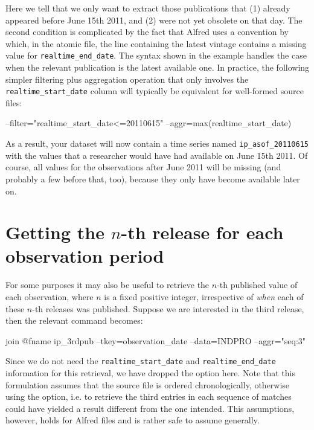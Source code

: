 \begin{itemize}
  Here we tell  that we only want to extract those
  publications that (1) already appeared before June 15th 2011, and
  (2) were not yet obsolete on that day. The second condition is
  complicated by the fact that Alfred uses a convention by which, in
  the atomic file, the line containing the latest vintage contains a
  missing value for \texttt{realtime\_end\_date}. The syntax shown in
  the example handles the case when the relevant publication is the
  latest available one. In practice, the following simpler filtering
  plus aggregation operation that only involves the
  \verb|realtime_start_date| column will typically be equivalent for
  well-formed source files: 
\end{itemize}
\begin{code}
  --filter="realtime_start_date<=20110615" --aggr=max(realtime_start_date)
\end{code}
As a result, your dataset will now contain a time series named
\verb|ip_asof_20110615| with the values that a researcher would have
had available on June 15th 2011. Of course, all values for the
observations after June 2011 will be missing (and probably a few
before that, too), because they only have become available later on.

\section{Getting the $n$-th release for each observation period}

For some purposes it may also be useful to retrieve the $n$-th published
value of each observation, where $n$ is a fixed positive integer,
irrespective of \emph{when} each of these $n$-th releases was
published. Suppose we are interested in the third release, then the
relevant  command becomes:
\begin{code}
  join @fname ip_3rdpub --tkey=observation_date --data=INDPRO --aggr="seq:3"
\end{code}
Since we do not need the \verb|realtime_start_date| and
\verb|realtime_end_date| information for this retrieval, we have
dropped the  option here. Note that this formulation
assumes that the source file is ordered chronologically, otherwise
using the  option, i.e. to retrieve the third
entries in each sequence of matches could have yielded a result
different from the one intended. This assumptions, however, holds for
Alfred files and is rather safe to assume generally.

